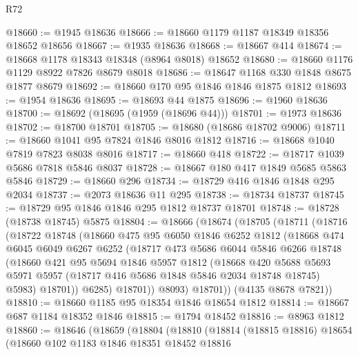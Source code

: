 \begin{lexlean}{R72}
\begin{coremodule}
@18660 := @1945 @18636
@18666 := @18660 @1179 @1187 @18349 @18356 @18652 @18656
@18667 := @1935 @18636
@18668 := @18667 @414
@18674 := @18668 @1178 @18343 @18348 (@8964 @8018) @18652
@18680 := @18660 @1176 @1129 @8922 @7826 @8679 @8018
@18686 := @18647 @1168 @330 @1848 @8675 @1877 @8679
@18692 := @18660 @170 @95 @1846 @1846 @1875 @1812
@18693 := @1954 @18636
@18695 := @18693 @44 @1875
@18696 := @1960 @18636
@18700 := @18692 (@18695 (@1959 (@18696 @44)))
@18701 := @1973 @18636
@18702 := @18700 @18701
@18705 := @18680 (@18686 @18702 @9006)
@18711 := @18660 @1041 @95 @7824 @1846 @8016 @1812
@18716 := @18668 @1040 @7819 @7823 @8038 @8016
@18717 := @18660 @418
@18722 := @18717 @1039 @5686 @7818 @5846 @8037
@18728 := @18667 @180 @417 @1849 @5685 @5863 @5846
@18729 := @18660 @296
@18734 := @18729 @416 @1846 @1848 @295 @2034
@18737 := @2073 @18636 @11 @295
@18738 := @18734 @18737
@18745 := @18729 @95 @1846 @1846 @295 @1812 @18737 @18701
@18748 := @18728 (@18738 @18745) @5875
@18804 := @18666
    (@18674
      (@18705
        (@18711
          (@18716
            (@18722
              @18748
              (@18660
                @475
                @95
                @6050
                @1846
                @6252
                @1812
                (@18668
                  @474
                  @6045
                  @6049
                  @6267
                  @6252
                  (@18717
                    @473
                    @5686
                    @6044
                    @5846
                    @6266
                    @18748
                    (@18660
                      @421
                      @95
                      @5694
                      @1846
                      @5957
                      @1812
                      (@18668
                        @420
                        @5688
                        @5693
                        @5971
                        @5957
                        (@18717 @416 @5686 @1848 @5846 @2034 @18748 @18745)
                        @5983)
                      @18701))
                  @6285)
                @18701))
            @8093)
          @18701))
      (@4135 @8678 @7821))
@18810 := @18660 @1185 @95 @18354 @1846 @18654 @1812
@18814 := @18667 @687 @1184 @18352 @1846
@18815 := @1794 @18452
@18816 := @8963 @1812
@18860 := @18646
    (@18659
      (@18804
        (@18810
          (@18814
            (@18815 @18816)
            @18654
            (@18660
              @102
              @1183
              @1846
              @18351
              @18452
              @18816

\end{coremodule}
\end{lexlean}
